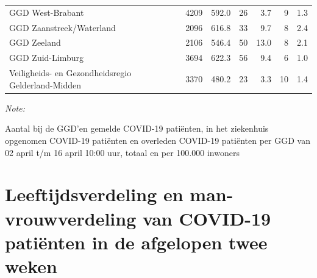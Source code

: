 \documentclass[
  english,
  man,floatsintext]{apa6}
\begin{document}
\begin{table}
\begin{threeparttable}
\begin{tabular}{lrrrrrr}
GGD West-Brabant & 4209 & 592.0 & 26 & 3.7 & 9 & 1.3\\
GGD Zaanstreek/Waterland & 2096 & 616.8 & 33 & 9.7 & 8 & 2.4\\
GGD Zeeland & 2106 & 546.4 & 50 & 13.0 & 8 & 2.1\\
GGD Zuid-Limburg & 3694 & 622.3 & 56 & 9.4 & 6 & 1.0\\
Veiligheids- en Gezondheidsregio Gelderland-Midden & 3370 & 480.2 & 23 & 3.3 & 10 & 1.4\\
\bottomrule
\end{tabular}
\begin{tablenotes}
\item \textit{Note: } 
\item Aantal bij de GGD’en gemelde COVID-19 patiënten, in het ziekenhuis opgenomen COVID-19 patiënten en overleden COVID-19 patiënten per GGD van 02 april t/m 16 april 10:00 uur, totaal en per 100.000 inwoners
\end{tablenotes}
\end{threeparttable}
\endgroup{}
\end{table}

\newpage

\hypertarget{leeftijdsverdeling-en-man-vrouwverdeling-van-covid-19-patiuxebnten-in-de-afgelopen-twee-weken}{%
\section{Leeftijdsverdeling en man-vrouwverdeling van COVID-19 patiënten in de afgelopen twee weken}\label{leeftijdsverdeling-en-man-vrouwverdeling-van-covid-19-patiuxebnten-in-de-afgelopen-twee-weken}}
\end{document}

